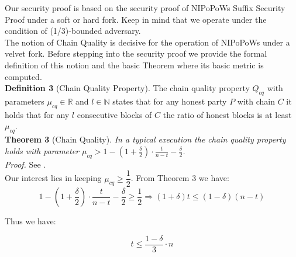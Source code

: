 Our security proof is based on the security proof of NIPoPoWs Suffix Security Proof
under a soft or hard fork. Keep in mind that we operate under the condition of
(1/3)-bounded adversary.\\

The notion of Chain Quality is decisive for the operation of NIPoPoWs under a
velvet fork. Before stepping into the security proof we provide the formal
definition of this notion and the basic Theorem where its basic metric is computed.\\

\textbf{Definition 3 }(Chain Quality Property)\cite{Backbone}. The chain quality
property $Q_{cq}$ with parameters $\mu_{cq} \in \mathbb{R}$ and $l \in \mathbb{N}$
states that for any honest party $P$ with chain $C$ it holds that for any
$l $ consecutive blocks of $C$ the ratio of honest blocks is at least $\mu_{cq}$.\\

\textbf{Theorem 3 }(Chain Quality)\cite{Backbone}. \textit{In a typical execution
the chain quality property holds with parameter $\mu_{cq} > 1 - (1 + \frac{\delta}{2})
\cdot \frac{t}{n-t} - \frac{\delta}{2}$.}\\
\textit{Proof.} See \cite{Backbone}.\\

Our interest lies in keeping $\mu_{cq} \geq \dfrac{1}{2}$.
From Theorem 3 we have:
\begin{equation*}
	1 - (1 + \frac{\delta}{2}) \cdot \frac{t}{n-t} - \frac{\delta}{2} \geq \dfrac{1}{2} \Rightarrow 
	(1 + \delta)t \leq (1-\delta)(n-t)
\end{equation*}

Thus we have:
\begin{center}
\begin{equation}
	t \leq \dfrac{1 - \delta}{3}\cdot n
\end{equation}
\end{center}


